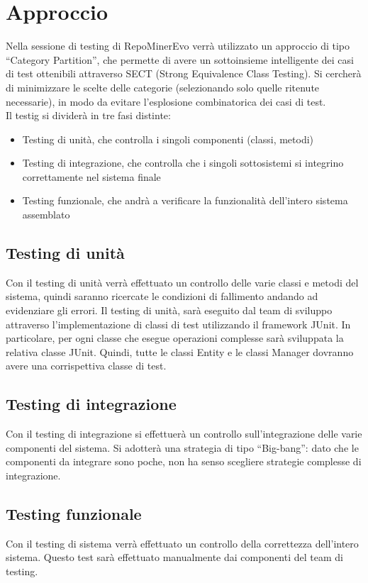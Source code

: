 \chapter{Approccio}
Nella sessione di testing di RepoMinerEvo verrà utilizzato un approccio di tipo ``Category Partition'', che permette di avere un sottoinsieme intelligente dei casi di test ottenibili attraverso SECT (Strong Equivalence Class Testing). Si cercherà di minimizzare le scelte delle categorie (selezionando solo quelle ritenute necessarie), in modo da evitare l'esplosione combinatorica dei casi di test.\\
Il testig si dividerà in tre fasi distinte:\\
\begin{itemize}
\item Testing di unità, che controlla i singoli componenti (classi, metodi)\\
\item Testing di integrazione, che controlla che i singoli sottosistemi si integrino correttamente nel sistema finale\\
\item Testing funzionale, che andrà a verificare la funzionalità dell’intero sistema assemblato\\
\end{itemize}
\section{Testing di unità}
Con il testing di unità verrà effettuato un controllo delle varie classi e metodi del sistema, quindi saranno ricercate le condizioni di fallimento andando ad evidenziare gli errori. Il testing di unità, sarà eseguito dal team di sviluppo attraverso l’implementazione di classi di test utilizzando il framework JUnit. In particolare, per ogni classe che esegue operazioni complesse sarà sviluppata la relativa classe JUnit. Quindi, tutte le classi Entity e le classi Manager dovranno avere una corrispettiva classe di test.\\

\section{Testing di integrazione}
Con il testing di integrazione si effettuerà un controllo sull’integrazione delle varie componenti del sistema. Si adotterà una strategia di tipo ``Big-bang'': dato che le componenti da integrare sono poche, non ha senso scegliere strategie complesse di integrazione.\\

\section{Testing funzionale}
Con il testing di sistema verrà effettuato un controllo della correttezza dell’intero sistema. Questo test sarà effettuato manualmente dai componenti del team di testing.